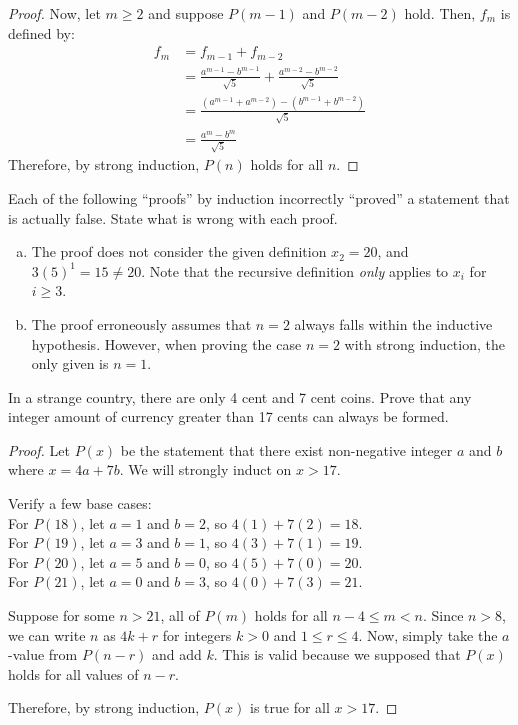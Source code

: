 \begin{enumerate}[(a)]
\begin{proof}
          Now, let $m \geq 2$ and suppose $P(m-1)$ and $P(m-2)$ hold. Then, $f_m$ is defined by:
          \begin{align*}
            f_m & = f_{m-1} + f_{m-2}                                                   \\
                & = \frac{a^{m-1}-b^{m-1}}{\sqrt{5}} + \frac{a^{m-2}-b^{m-2}}{\sqrt{5}} \\
                & = \frac{(a^{m-1} + a^{m-2}) - (b^{m-1} + b^{m-2})}{\sqrt{5}}          \\
                & = \frac{a^m - b^m}{\sqrt{5}}
          \end{align*}
          Therefore, by strong induction, $P(n)$ holds for all $n$.
        \end{proof}
\end{enumerate}


\question Each of the following ``proofs'' by induction incorrectly ``proved'' a statement that is actually false.
State what is wrong with each proof.
\begin{enumerate}[(a)]
  \item The proof does not consider the given definition $x_2=20$, and $3(5)^1 = 15 \neq 20$.
        Note that the recursive definition \emph{only} applies to $x_i$ for $i \geq 3$.
  \item The proof erroneously assumes that $n=2$ always falls within the inductive hypothesis.
        However, when proving the case $n=2$ with strong induction, the only given is $n=1$.
\end{enumerate}


\question In a strange country, there are only 4 cent and 7 cent coins.
Prove that any integer amount of currency greater than 17 cents can always be formed.
\begin{proof}
  Let $P(x)$ be the statement that there exist non-negative integer $a$ and $b$ where $x=4a+7b$.
  We will strongly induct on $x > 17$.

  Verify a few base cases: \\
  For $P(18)$, let $a=1$ and $b=2$, so $4(1)+7(2)=18$. \\
  For $P(19)$, let $a=3$ and $b=1$, so $4(3)+7(1)=19$. \\
  For $P(20)$, let $a=5$ and $b=0$, so $4(5)+7(0)=20$. \\
  For $P(21)$, let $a=0$ and $b=3$, so $4(0)+7(3)=21$.

  Suppose for some $n > 21$, all of $P(m)$ holds for all $n-4 \leq m < n$.
  Since $n > 8$, we can write $n$ as $4k+r$ for integers $k > 0$ and $1 \leq r \leq 4$.
  Now, simply take the $a$-value from $P(n-r)$ and add $k$.
  This is valid because we supposed that $P(x)$ holds for all values of $n-r$.

  Therefore, by strong induction, $P(x)$ is true for all $x > 17$.
\end{proof}

